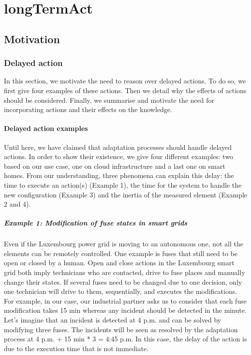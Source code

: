 \section[Long-term actions]{\Gls{longTermAct}}
\label{sec:example:tkm}


\subsection{Motivation}
\label{sec:tkm:intro:motiv}

\subsubsection{Delayed action}
\label{sec:tkm:intro:motiv:delayed_action}

In this section, we motivate the need to reason over delayed actions.
To do so, we first give four examples of these actions.
Then we detail why the effects of actions should be considered.
Finally, we summarise and motivate the need for incorporating actions and their effects on the knowledge. 

\paragraph{Delayed action examples}
Until here, we have claimed that adaptation processes should handle delayed actions.
In order to show their existence, we give four different examples: two based on our use case, one on cloud infrastructure and a last one on smart homes.
From our understanding, three phenomena can explain this delay: the time to execute an action(s) (Example 1), the time for the system to handle the new configuration (Example 3) and the inertia of the measured element (Example 2 and 4).

\subparagraph{Example 1: Modification of fuse states in smart grids}
Even if the Luxembourg power grid is moving to an autonomous one, not all the elements can be remotely controlled.
One example is fuses that still need to be open or closed by a human.
Open and close actions in the Luxembourg smart grid both imply technicians who are contacted, drive to fuse places and manually change their states.
If several fuses need to be changed due to one decision, only one technician will drive to them, sequentially, and executes the modifications.
For example, in our case, our industrial partner asks us to consider that each fuse modification takes 15 min whereas any incident should be detected in the minute.
Let's imagine that an incident is detected at 4 p.m. and can be solved by modifying three fuses.
The incidents will be seen as resolved by the adaptation process at 4 p.m. + 15 min * 3 = 4:45 p.m.
In this case, the delay of the action is due to the execution time that is not immediate.

